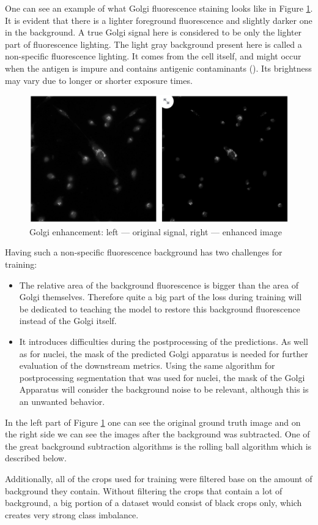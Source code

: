 One can see an example of what Golgi fluorescence staining looks like in Figure \ref{fig:golgi-enhancement}. It is evident that there is a lighter foreground fluorescence and slightly darker one in the background. A true Golgi signal here is considered to be only the lighter part of fluorescence lighting. The light gray background present here is called a non-specific fluorescence lighting. It comes from the cell itself, and might occur when the antigen is impure and contains antigenic contaminants (\cite{Borek_1984}). Its brightness may vary due to longer or shorter exposure times. 

\begin{figure}[htb]
	\begin{center}
		\includegraphics[width=0.5\linewidth]{bilder/enhancement.jpg}
		\caption{Golgi enhancement: left --- original signal, right --- enhanced image}\label{fig:golgi-enhancement}
	\end{center}
\end{figure}

Having such a non-specific fluorescence background has two challenges for training:
\begin{itemize}
    \item The relative area of the background fluorescence is bigger than the area of Golgi themselves. Therefore quite a big part of the loss during training will be dedicated to teaching the model to restore this background fluorescence instead of the Golgi itself.
    \item It introduces difficulties during the postprocessing of the predictions. As well as for nuclei, the mask of the predicted Golgi apparatus is needed for further evaluation of the downstream metrics. Using the same algorithm for postprocessing segmentation that was used for nuclei, the mask of the Golgi Apparatus will consider the background noise to be relevant, although this is an unwanted behavior.
\end{itemize}

In the left part of Figure \ref{fig:golgi-enhancement} one can see the original ground truth image and on the right side we can see the images after the background was subtracted. One of the great background subtraction algorithms is the rolling ball algorithm which is described below.

Additionally, all of the crops used for training were filtered base on the amount of background they contain. Without filtering the crops that contain a lot of background, a big portion of a dataset would consist of black crops only, which creates very strong class imbalance.
